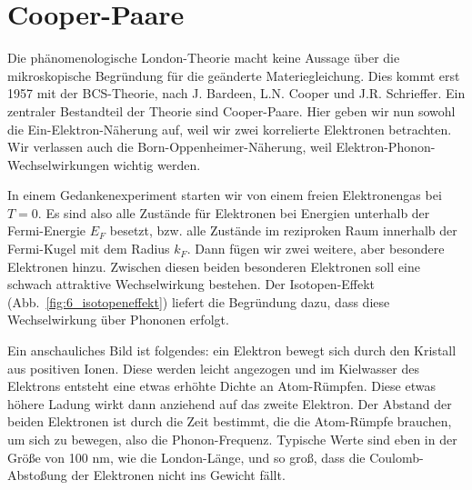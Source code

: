 \section{Cooper-Paare}

Die phänomenologische London-Theorie macht keine Aussage über die mikroskopische Begründung für die geänderte Materiegleichung. Dies kommt erst 1957 mit der BCS-Theorie, nach J. Bardeen, L.N. Cooper und J.R. Schrieffer. Ein zentraler Bestandteil der Theorie sind Cooper-Paare. Hier geben wir nun sowohl die Ein-Elektron-Näherung auf, weil wir zwei korrelierte Elektronen betrachten. Wir verlassen auch die Born-Oppenheimer-Näherung, weil Elektron-Phonon-Wechselwirkungen wichtig werden.

In einem Gedankenexperiment starten wir von einem freien Elektronengas bei $T=0$. Es sind also alle Zustände für Elektronen bei Energien unterhalb der Fermi-Energie $E_F$ besetzt, bzw. alle Zustände im reziproken Raum innerhalb der Fermi-Kugel mit dem Radius $k_F$. Dann fügen wir zwei weitere, aber besondere Elektronen hinzu. Zwischen diesen beiden besonderen Elektronen soll eine schwach attraktive Wechselwirkung bestehen. Der Isotopen-Effekt (Abb.~\ref{fig:6_isotopeneffekt}) liefert die Begründung dazu, dass diese Wechselwirkung über Phononen erfolgt. 

Ein anschauliches Bild ist folgendes: ein Elektron bewegt sich durch den Kristall aus positiven Ionen. Diese werden leicht angezogen und im Kielwasser des Elektrons entsteht eine etwas erhöhte Dichte an Atom-Rümpfen. Diese etwas höhere Ladung wirkt dann anziehend auf das zweite Elektron. Der Abstand der beiden Elektronen ist durch die Zeit bestimmt, die die Atom-Rümpfe brauchen, um sich zu bewegen, also die Phonon-Frequenz. Typische Werte sind eben in der Größe von 100 nm, wie die London-Länge, und so groß, dass die Coulomb-Abstoßung  der Elektronen nicht ins Gewicht fällt.

